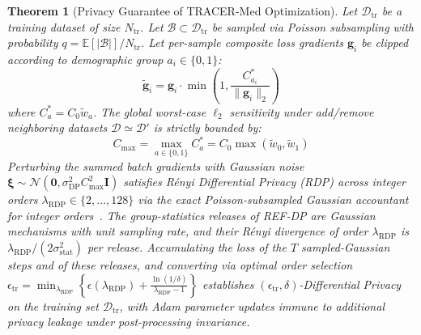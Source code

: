 \documentclass[pdflatex,sn-vancouver-num,referee,lineno]{sn-jnl}
\theoremstyle{thmstyleone}
\newtheorem{theorem}{Theorem}
\theoremstyle{thmstylethree}
\begin{document}
\begin{theorem}[Privacy Guarantee of TRACER-Med Optimization]
\label{thm:privacy}
Let $\mathcal{D}_{\text{tr}}$ be a training dataset of size $N_{\text{tr}}$. Let $\mathcal{B} \subset \mathcal{D}_{\text{tr}}$ be sampled via Poisson subsampling with probability $q = \mathbb{E}[|\mathcal{B}|]/N_{\text{tr}}$. Let per-sample composite loss gradients $\mathbf{g}_i$ be clipped according to demographic group $a_i \in \{0, 1\}$:
\begin{equation}
    \tilde{\mathbf{g}}_i = \mathbf{g}_i \cdot \min\left(1, \frac{C_{a_i}^*}{\|\mathbf{g}_i\|_2}\right)
\end{equation}
where $C_a^* = C_0 \tilde{w}_a$. The global worst-case $\ell_2$ sensitivity under add/remove neighboring datasets $\mathcal{D} \simeq \mathcal{D}'$ is strictly bounded by:
\begin{equation}
    C_{\max} = \max_{a \in \{0, 1\}} C_a^* = C_0 \max(\tilde{w}_0, \tilde{w}_1)
\end{equation}
Perturbing the summed batch gradients with Gaussian noise $\boldsymbol{\xi} \sim \mathcal{N}\left(\mathbf{0}, \sigma_{\text{DP}}^2 C_{\max}^2 \mathbf{I}\right)$ satisfies Rényi Differential Privacy (RDP) across integer orders $\lambda_{\text{RDP}} \in \{2,\dots,128\}$ via the exact Poisson-subsampled Gaussian accountant for integer orders~\cite{mironov2019renyi}. The group-statistics releases of REF-DP are Gaussian mechanisms with unit sampling rate, and their R\'enyi divergence of order $\lambda_{\text{RDP}}$ is $\lambda_{\text{RDP}}/(2\sigma_{\text{stat}}^2)$ per release. Accumulating the loss of the $T$ sampled-Gaussian steps and of these releases, and converting via optimal order selection $\epsilon_{\text{tr}} = \min_{\lambda_{\text{RDP}}} \left\{ \epsilon(\lambda_{\text{RDP}}) + \frac{\ln(1/\delta)}{\lambda_{\text{RDP}} - 1} \right\}$ establishes $(\epsilon_{\text{tr}}, \delta)$-Differential Privacy on the training set $\mathcal{D}_{\text{tr}}$, with Adam parameter updates immune to additional privacy leakage under post-processing invariance.
\end{theorem}
\end{document}
